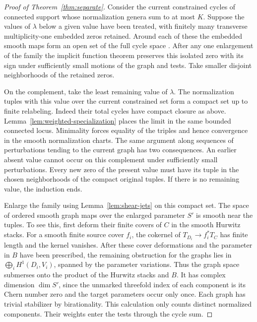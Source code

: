 \begin{proof}[Proof of Theorem~\ref{thm:separate}]
Consider the current constrained cycles of connected support whose
normalization genera sum to at most $K$. Suppose the values of
$\lambda$ below a given value have been treated, with finitely many
transverse multiplicity-one embedded zeros retained. Around each
of these the embedded smooth maps form an open set of the full cycle
space \cite[Proposition~2.21]{DIW}. After any one enlargement of
the family the implicit function theorem preserves this isolated zero
with its sign under sufficiently small motions of the graph and tests.
Take smaller disjoint neighborhoods of the retained zeros.

On the complement, take the least remaining value of $\lambda$. The
normalization tuples with this value over the current constrained set
form a compact set up to finite relabeling. Indeed their total cycles
have compact closure as above. Lemma~\ref{lem:weighted-specialization}
places the limit in the same bounded connected locus. Minimality
forces equality of the triples and hence convergence in the smooth
normalization charts. The same argument along sequences of
perturbations tending to the current graph has two consequences. An
earlier absent value cannot occur on this complement under sufficiently
small perturbations. Every new zero of the present value must have
its tuple in the chosen neighborhoods of the compact original tuples.
If there is no remaining value, the induction ends.

Enlarge the family using Lemma~\ref{lem:shear-jets} on this compact
set. The space of ordered smooth graph maps over the enlarged
parameter $S'$ is smooth near the tuples. To see this, first deform
their finite covers of $C$ in the smooth Hurwitz stacks. For a smooth
finite source cover $f_i$, the cokernel of
$T_{D_i}\to f_i^*T_C$ has finite length and the kernel vanishes.
After these cover deformations and the parameter in $B$ have been
prescribed, the remaining obstruction for the graphs lies in
$\bigoplus_i H^1(D_i,V_i)$, spanned by the parameter variations.
Thus the graph space submerses onto the product of the Hurwitz
stacks and $B$. It has complex dimension $\dim S'$, since the
unmarked threefold index of each component is its Chern number zero
and the target parameters occur only once. Each graph has trivial
stabilizer by birationality. This calculation only counts distinct
normalized components. Their weights enter the tests through the
cycle sum.


\end{proof}
